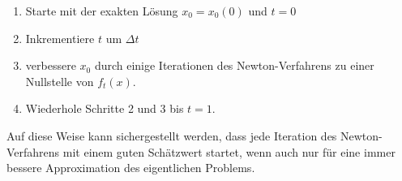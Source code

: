 \begin{enumerate}
\item 
Starte mit der exakten Lösung $x_0=x_0(0)$ und $t=0$
\item
Inkrementiere $t$ um $\Delta t$
\item
verbessere $x_0$ durch einige Iterationen des Newton-Verfahrens
zu einer Nullstelle von $f_t(x)$.
%
\item 
Wiederhole Schritte 2 und 3 bis $t=1$.
\end{enumerate}
%
Auf diese Weise kann sichergestellt werden, dass jede Iteration
des Newton-Verfahrens mit einem guten Schätzwert startet, wenn auch
nur für eine immer bessere Approximation des eigentlichen Problems.
%
%







